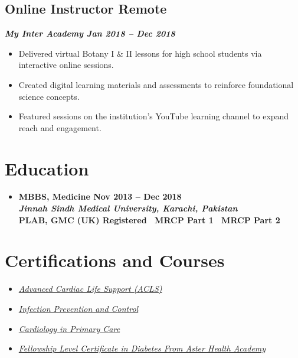 \documentclass[a4paper,11pt]{article}
\begin{document}
\subsection*{Online Instructor \hfill Remote}
\vspace{-0.6em}
\textbf{\textit{My Inter Academy \hfill Jan 2018 -- Dec 2018}}
\vspace{-0.6em}
\begin{itemize}
    \item Delivered virtual Botany I \& II lessons for high school students via interactive online sessions.
    \item Created digital learning materials and assessments to reinforce foundational science concepts.
    \item Featured sessions on the institution's YouTube learning channel to expand reach and engagement.
\end{itemize}


\section*{Education}
\vspace{-0.6em}
\begin{itemize}[leftmargin=*]
    \item \textbf{MBBS, Medicine \hfill Nov 2013 -- Dec 2018}\\
    \textbf{\textit{Jinnah Sindh Medical University, Karachi, Pakistan}}\\
    \textbf{PLAB, GMC (UK) Registered \textbar\ MRCP Part 1 \textbar\ MRCP Part 2}
\end{itemize}


\section*{Certifications and Courses}
\vspace{-0.6em}
\begin{itemize}[leftmargin=*]
    \item \href{https://drive.google.com/file/d/1E8XOtF89mgY4qOdTR3bYIP_lBqWW2AS4/view?usp=sharing}{\textit{Advanced Cardiac Life Support (ACLS)}}
    \item \href{https://drive.google.com/file/d/1-nO4B3Wke90wIBe0PfPcolCNRB0oedlH/view?usp=sharing}{\textit{Infection Prevention and Control}}
    \item \href{https://drive.google.com/file/d/13m-N7SaEGEHE-dVFXlW92VU1zKTzSSgP/view?usp=sharing}{\textit{Cardiology in Primary Care}}
    \item \href{https://drive.google.com/file/d/1KarBhv2HWtflw30leo5xnW23jluMzpJI/view?usp=sharing}{\textit{Fellowship Level Certificate in Diabetes From Aster Health Academy}}
\end{itemize}
\end{document}
